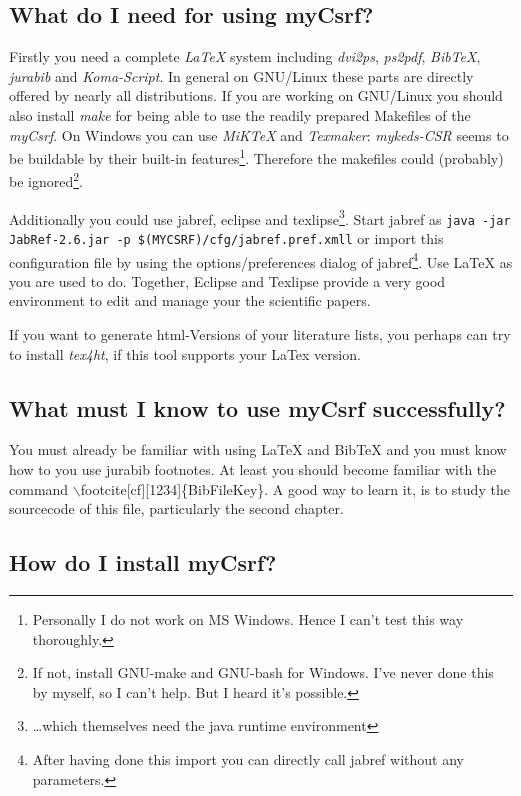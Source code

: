 \documentclass[
  DIV=calc,
  BCOR=5mm,
  11pt,
  headings=small,
  oneside,
  abstract=true,
  toc=bib,
  ngerman,english]{scrartcl}
\begin{document}
\subsection{What do I need for using myCsrf?}
Firstly you need a complete \textit{LaTeX} system including \textit{dvi2ps},
\textit{ps2pdf}, \textit{BibTeX}, \textit{jurabib} and \textit{Koma-Script}. In
general on GNU/Linux these parts are directly offered by nearly all
distributions. If you are working on GNU/Linux you should also install
\textit{make} for being able to use the readily prepared Makefiles of the
\textit{myCsrf}. On Windows you can use \textit{MiKTeX} and
\textit{Texmaker}: \textit{my\-keds-CSR} seems to be buildable by their built-in
features\footnote{Personally I do not work on MS Windows. Hence I can't test
this way thoroughly.}. Therefore the makefiles could (probably) be
ignored\footnote{If not, install GNU-make and GNU-bash for Windows. I've never
done this by myself, so I can't help. But I heard it's possible.}.

Additionally you could use jabref, eclipse and texlipse\footnote{\ldots which
themselves need the java runtime environment}. Start jabref as 
\texttt{java -jar JabRef-2.6.jar -p \$(MYCSRF)/cfg/jabref.pref.xmll} 
or import this configuration file by using the options/preferences dialog of
jab\-ref\footnote{After having done this import you can directly call jabref
without any parameters.}. Use LaTeX as you are used to do. Together, Eclipse and
Texlipse provide a very good environment to edit and manage your the scientific
papers.

If you want to generate html-Versions of your literature lists, you perhaps can
try to install \textit{tex4ht}, if this tool supports your LaTex version.

\subsection{What must I know to use myCsrf successfully?}
You must already be familiar with using LaTeX and BibTeX and you must know how
to you use jurabib footnotes. At least you should become familiar with the
command $\backslash$footcite[cf][1234]\{BibFileKey\}. A good way to learn it, is to
study the sourcecode of this file, particularly the second chapter.

\subsection{How do I install myCsrf?}
\end{document}
